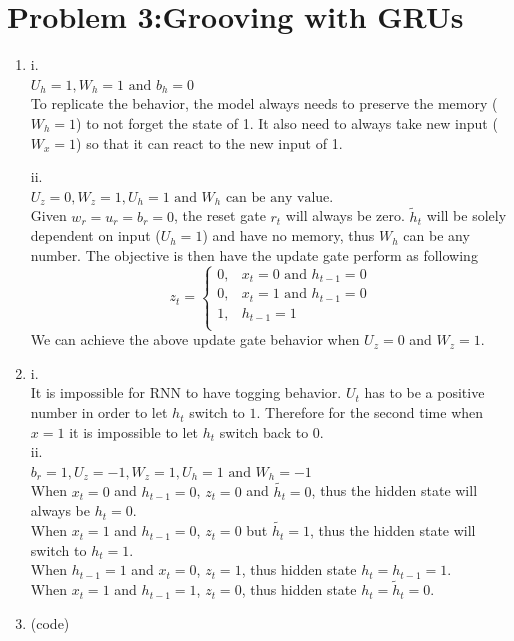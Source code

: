 \documentclass[10pt]{article}
\begin{document}
\section*{Problem 3:Grooving with GRUs}
\begin{enumerate}[label=(\alph*)]
\item
i.\\
$\boxed{U_h = 1, W_h = 1 \text{ and } b_h = 0}$\\
To replicate the behavior, the model always needs to preserve the memory ($W_h = 1$) to not forget the state of 1. It also need to always take new input ($W_x = 1$) so that it can react to the new input of 1.\par
ii.\\
$\boxed{U_z = 0, W_z = 1, U_h = 1 \text{ and } W_h \text{ can be any value.}}$\\
Given $w_r = u_r = b_r = 0$, the reset gate $r_t$ will always be zero. $\tilde{h}_t$ will be solely dependent on input ($U_h = 1$) and have no memory, thus $W_h$ can be any number. The objective is then have the update gate perform as following
$$z_t = \begin{cases}
 0, & x_t = 0 \text{ and } h_{t-1} = 0\\
 0, & x_t = 1 \text{ and } h_{t-1} = 0\\
 1, & h_{t-1} = 1\\
\end{cases}$$
We can achieve the above update gate behavior when $U_z=0$ and $W_z = 1$.
\item
i.\\
It is impossible for RNN to have togging behavior.
$U_t$ has to be a positive number in order to let $h_t$ switch to $1$.
Therefore for the second time when $x = 1$ it is impossible to let $h_t$ switch back to $0$.\\

ii.\\
$\boxed{b_r = 1, U_z = -1, W_z = 1, U_h = 1 \text{ and }W_h = -1}$\\
When $x_t=0$ and $h_{t-1} = 0$, $z_t = 0$ and $\tilde{h_t} = 0$, thus the hidden state will always be $h_t = 0$.\\
When $x_t=1$ and $h_{t-1} = 0$, $z_t = 0$ but $\tilde{h_t} = 1$, thus the hidden state will switch to $h_t = 1$.\\
When $h_{t-1}=1$ and $x_t=0$, $z_t = 1$, thus hidden state $h_t = h_{t-1} = 1$.\\
When $x_t=1$ and $h_{t-1} = 1$, $z_t = 0$, thus hidden state $h_t = \tilde{h}_t = 0$.\\
\item
(code)


\end{enumerate}
\end{document}
